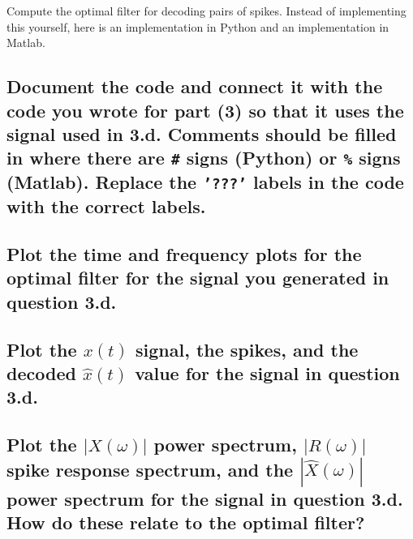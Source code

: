 \documentclass{article}
\begin{document}
Compute the optimal filter for decoding pairs of spikes. Instead of
implementing this yourself, here is an implementation in Python and an
implementation in Matlab.

\subsection{Document the code and connect it with the code you wrote for part (3) so
that it uses the signal used in 3.d. Comments should be filled in where
there are \texttt{\#} signs (Python) or \texttt{\%} signs (Matlab).
Replace the \texttt{'???'} labels in the code with the correct labels.}
\subsection{Plot the time and frequency plots for the optimal filter for the signal
you generated in question 3.d.}
\subsection{Plot the $x(t)$ signal, the spikes, and the decoded $\hat{x}(t)$ value
for the signal in question 3.d.}
\subsection{Plot the $|X(\omega)|$ power spectrum, $|R(\omega)|$ spike response
spectrum, and the $|\hat{X}(\omega)|$ power spectrum for the signal in
question 3.d. How do these relate to the optimal filter?}
\end{document}
